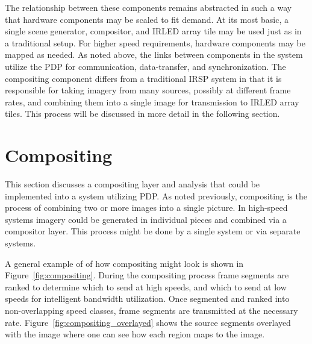     The relationship between these components remains abstracted in such a way that hardware components may be scaled to fit demand. At its most basic, a single scene generator, compositor, and IRLED array tile may be used just as in a traditional setup. For higher speed requirements, hardware components may be mapped as needed. As noted above, the links between components in the system utilize the PDP for communication, data-transfer, and synchronization. The compositing component differs from a traditional IRSP system in that it is responsible for taking imagery from many sources, possibly at different frame rates, and combining them into a single image for transmission to IRLED array tiles. This process will be discussed in more detail in the following section.

\section{Compositing}
    \label{sec:compositing}
    This section discusses a compositing layer and analysis that could be implemented into a system utilizing PDP. As noted previously, compositing is the process of combining two or more images into a single picture. In high-speed systems imagery could be generated in individual pieces and combined via a compositor layer. This process might be done by a single system or via separate systems.

    A general example of of how compositing might look is shown in Figure~\ref{fig:compositing}. During the compositing process frame segments are ranked to determine which to send at high speeds, and which to send at low speeds for intelligent bandwidth utilization. Once segmented and ranked into non-overlapping speed classes, frame segments are transmitted at the necessary rate. Figure~\ref{fig:compositing_overlayed} shows the source segments overlayed with the image where one can see how each region maps to the image.

